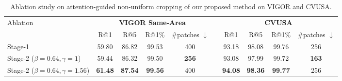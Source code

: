 \documentclass[10pt,twocolumn,letterpaper]{article}
\begin{document}
\begin{table*}[!htbp]
\centering
    \begin{tabular}{l c c c c c c c c c}
    \hline
    
    \hline \multirow{2}{*}{Ablation}  & \multicolumn{4}{c}{\textbf{VIGOR Same-Area}}& & \multicolumn{4}{c}{\textbf{CVUSA}} \\
    \cline{2-5} \cline{7-10} 
      ~ & R@1 & R@5 & R@1\% & \#patches $\downarrow$  &  & R@1 & R@5 & R@1\% & \#patches $\downarrow$ \\
     \hline
     \hline
     Stage-1  & 59.80 & 86.82 & 99.53 & 400  & & 93.18 & 98.08 & 99.76 & 256 \\
     Stage-2 ($\beta = 0.64, \gamma=1$) & 59.44 & 86.32 & 99.50 & \textbf{256} &  & 93.08 & 97.99  & 99.72 & \textbf{163} \\
     Stage-2 ($\beta = 0.64, \gamma=1.56$) & \textbf{61.48} & \textbf{87.54} & \textbf{99.56} & 400 & & \textbf{94.08} & \textbf{98.36}  & \textbf{99.77} & 256 \\
    \hline
    
    \hline
    \end{tabular}
    \caption{Ablation study on attention-guided non-uniform cropping of our proposed method on VIGOR and CVUSA.}
    \label{tab:crop}
\end{table*}
\end{document}
